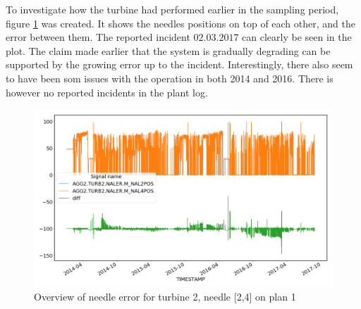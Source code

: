         To investigate how the turbine had performed earlier in the sampling period, figure \ref{fig:plant1_needle_error} was created. It shows the needles positions on top of each other, and the error between them. The reported incident $02.03.2017$ can clearly be seen in the plot. The claim made earlier that the system is gradually degrading can be supported by the growing error up to the incident. Interestingly, there also seem to have been som issues with the operation in both 2014 and 2016. There is however no reported incidents in the plant log. 
        \begin{figure}
            \centering
            \includegraphics[width=\textwidth]{report/figures/data/turbine2_needle2_4.png}
            \caption{Overview of needle error for turbine 2, needle [2,4] on plan 1}
            \label{fig:plant1_needle_error}
        \end{figure}
        
        
